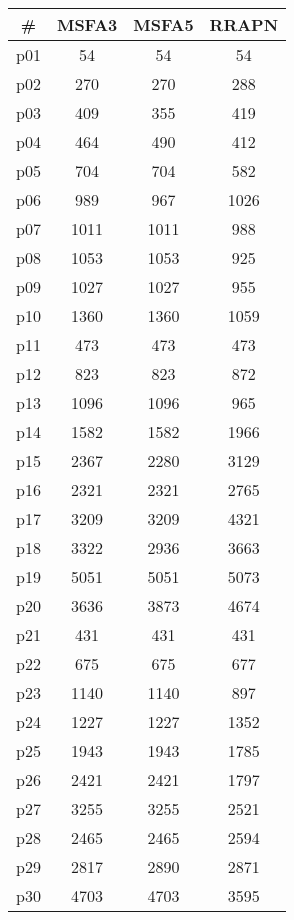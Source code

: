 \begin{tabular}{c||c|c|c}
\textbf{\#} & \textbf{MSFA3} & \textbf{MSFA5} & \textbf{RRAPN}\\
\hline
\hline
p01 & 54 & 54 & 54\\
p02 & 270 & 270 & 288\\
p03 & 409 & 355 & 419\\
p04 & 464 & 490 & 412\\
p05 & 704 & 704 & 582\\
p06 & 989 & 967 & 1026\\
p07 & 1011 & 1011 & 988\\
p08 & 1053 & 1053 & 925\\
p09 & 1027 & 1027 & 955\\
p10 & 1360 & 1360 & 1059\\
p11 & 473 & 473 & 473\\
p12 & 823 & 823 & 872\\
p13 & 1096 & 1096 & 965\\
p14 & 1582 & 1582 & 1966\\
p15 & 2367 & 2280 & 3129\\
p16 & 2321 & 2321 & 2765\\
p17 & 3209 & 3209 & 4321\\
p18 & 3322 & 2936 & 3663\\
p19 & 5051 & 5051 & 5073\\
p20 & 3636 & 3873 & 4674\\
p21 & 431 & 431 & 431\\
p22 & 675 & 675 & 677\\
p23 & 1140 & 1140 & 897\\
p24 & 1227 & 1227 & 1352\\
p25 & 1943 & 1943 & 1785\\
p26 & 2421 & 2421 & 1797\\
p27 & 3255 & 3255 & 2521\\
p28 & 2465 & 2465 & 2594\\
p29 & 2817 & 2890 & 2871\\
p30 & 4703 & 4703 & 3595\\
\end{tabular}

